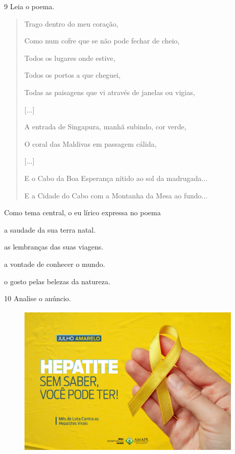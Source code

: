 \num{9} Leia o poema.

\begin{quote}
Trago dentro do meu coração,

Como num cofre que se não pode fechar de cheio,

Todos os lugares onde estive,

Todos os portos a que cheguei,

Todas as paisagens que vi através de janelas ou vigias,

{[}...{]}

A entrada de Singapura, manhã subindo, cor verde,

O coral das Maldivas em passagem cálida,

{[}...{]}

E o Cabo da Boa Esperança nítido ao sol da madrugada...

E a Cidade do Cabo com a Montanha da Mesa ao fundo...

\end{quote}

Como tema central, o eu lírico expressa no poema

\begin{escolha}
\item a saudade da sua terra natal.

\item as lembranças das suas viagens.

\item a vontade de conhecer o mundo.

\item o gosto pelas belezas da natureza.
\end{escolha}

\num{10} Analise o anúncio.

\begin{figure}[H]
\centering
\includegraphics[width=4.21103in,height=2.86458in]{./imgSAEB_8_POR/media/image31.png}
\end{figure}

